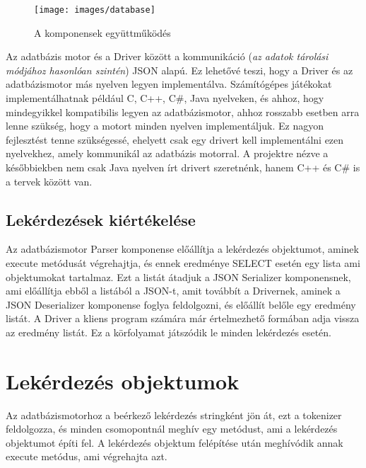 \begin{figure}[htb]
	\begin{center}
		\texttt{[image: images/database]}
		\caption{A komponensek együttműködés}
		\label{fig:database}
	\end{center}
\end{figure}

Az adatbázis motor és a Driver között a kommunikáció (\textit{az adatok tárolási módjához hasonlóan szintén}) JSON alapú. Ez lehetővé teszi, hogy a Driver és az adatbázismotor más nyelven legyen implementálva. Számítógépes játékokat implementálhatnak például C, C++, C\#, Java nyelveken, és ahhoz, hogy mindegyikkel kompatibilis legyen az adatbázismotor, ahhoz rosszabb esetben arra lenne szükség, hogy a motort minden nyelven implementáljuk. Ez nagyon fejlesztést tenne szükségessé, ehelyett csak egy drivert kell implementálni ezen nyelvekhez, amely kommunikál az adatbázis motorral. A projektre nézve a későbbiekben nem csak Java nyelven írt drivert szeretnénk, hanem C++ és C\# is a tervek között van.

\subsection{Lekérdezések kiértékelése}

Az adatbázismotor Parser komponense előállítja a lekérdezés objektumot, aminek execute metódusát végrehajtja, és ennek eredménye SELECT esetén egy lista ami objektumokat tartalmaz. Ezt a listát átadjuk a JSON Serializer komponensnek, ami előállítja ebből a listából a JSON-t, amit továbbít a Drivernek, aminek a JSON Deserializer komponense foglya feldolgozni, és előállít belőle egy eredmény listát. A Driver a kliens program számára már értelmezhető formában adja vissza az eredmény listát. Ez a körfolyamat játszódik le minden lekérdezés esetén.

\section{Lekérdezés objektumok}

Az adatbázismotorhoz a beérkező lekérdezés stringként jön át, ezt a tokenizer feldolgozza, és minden csomopontnál meghív egy metódust, ami a lekérdezés objektumot építi fel. A lekérdezés objektum felépítése után meghívódik annak execute metódus, ami végrehajta azt.


